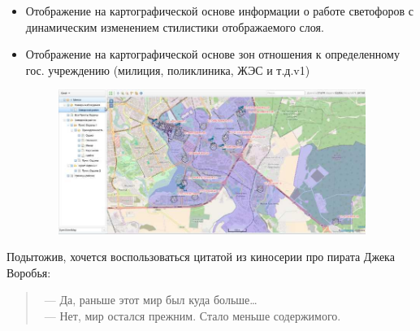\documentclass[10pt, a5paper]{article}
\begin{document}
\begin{itemize}
  \item Отображение на картографической основе информации о работе светофоров с динамическим изменением стилистики отображаемого слоя.
  \item Отображение на картографической основе зон отношения к определенному гос. учреждению (милиция, поликлиника, \linebreak ЖЭС и т.д.v1)

\begin{center}

\begin{figure}[h!]
  \centering
  \includegraphics[width=10cm]{stepanov4.jpg}
  
  \label{Stepanov4}
\end{figure}

\end{center}

\end{itemize}

Подытожив, хочется воспользоваться цитатой из киносерии про пирата Джека Воробья:

\begin{verse}
 ~--- Да, раньше этот мир был куда больше\ldots{} \\
 ~--- Нет, мир остался прежним. Стало меньше содержимого. \\
\end{verse}
\end{document}
